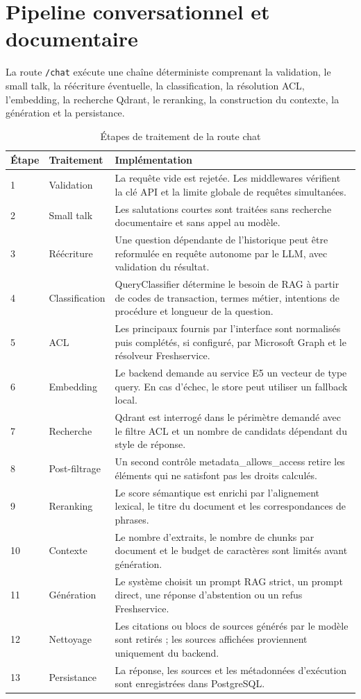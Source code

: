 \section{Pipeline conversationnel et documentaire}
La route \texttt{/chat} exécute une chaîne déterministe comprenant la validation, le small talk, la réécriture éventuelle, la classification, la résolution ACL, l'embedding, la recherche Qdrant, le reranking, la construction du contexte, la génération et la persistance.

\begin{table}[H]
\centering
\caption{Étapes de traitement de la route chat}
\label{tab:chat_steps_ch6}
\begin{tabular}{p{1.0cm}p{3.1cm}p{9.0cm}}
\toprule
\textbf{Étape} & \textbf{Traitement} & \textbf{Implémentation} \\
\midrule
1 & Validation & La requête vide est rejetée. Les middlewares vérifient la clé API et la limite globale de requêtes simultanées. \\
2 & Small talk & Les salutations courtes sont traitées sans recherche documentaire et sans appel au modèle. \\
3 & Réécriture & Une question dépendante de l’historique peut être reformulée en requête autonome par le LLM, avec validation du résultat. \\
4 & Classification & QueryClassifier détermine le besoin de RAG à partir de codes de transaction, termes métier, intentions de procédure et longueur de la question. \\
5 & ACL & Les principaux fournis par l’interface sont normalisés puis complétés, si configuré, par Microsoft Graph et le résolveur Freshservice. \\
6 & Embedding & Le backend demande au service E5 un vecteur de type query. En cas d’échec, le store peut utiliser un fallback local. \\
7 & Recherche & Qdrant est interrogé dans le périmètre demandé avec le filtre ACL et un nombre de candidats dépendant du style de réponse. \\
8 & Post-filtrage & Un second contrôle metadata\_allows\_access retire les éléments qui ne satisfont pas les droits calculés. \\
9 & Reranking & Le score sémantique est enrichi par l’alignement lexical, le titre du document et les correspondances de phrases. \\
10 & Contexte & Le nombre d’extraits, le nombre de chunks par document et le budget de caractères sont limités avant génération. \\
11 & Génération & Le système choisit un prompt RAG strict, un prompt direct, une réponse d’abstention ou un refus Freshservice. \\
12 & Nettoyage & Les citations ou blocs de sources générés par le modèle sont retirés ; les sources affichées proviennent uniquement du backend. \\
13 & Persistance & La réponse, les sources et les métadonnées d’exécution sont enregistrées dans PostgreSQL. \\
\bottomrule
\end{tabular}
\end{table}

